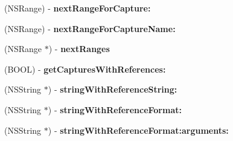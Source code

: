 \begin{DoxyCompactItemize}
\item 
\hypertarget{interface_r_k_enumerator_a52cf789fbf7fb3cbf4ed1032fa136017}{(N\-S\-Range) -\/ {\bfseries next\-Range\-For\-Capture\-:}}\label{interface_r_k_enumerator_a52cf789fbf7fb3cbf4ed1032fa136017}

\item 
\hypertarget{interface_r_k_enumerator_a4095a601af15dd62836adeb7105f88da}{(N\-S\-Range) -\/ {\bfseries next\-Range\-For\-Capture\-Name\-:}}\label{interface_r_k_enumerator_a4095a601af15dd62836adeb7105f88da}

\item 
\hypertarget{interface_r_k_enumerator_abbc9000769aeff849cf72e7ab527f760}{(N\-S\-Range $\ast$) -\/ {\bfseries next\-Ranges}}\label{interface_r_k_enumerator_abbc9000769aeff849cf72e7ab527f760}

\item 
\hypertarget{interface_r_k_enumerator_a1c0b4f336d4d2d43502f1589eab6023e}{(B\-O\-O\-L) -\/ {\bfseries get\-Captures\-With\-References\-:}}\label{interface_r_k_enumerator_a1c0b4f336d4d2d43502f1589eab6023e}

\item 
\hypertarget{interface_r_k_enumerator_a5fb7502952ee16f65bf61fa9c4ac72f3}{(N\-S\-String $\ast$) -\/ {\bfseries string\-With\-Reference\-String\-:}}\label{interface_r_k_enumerator_a5fb7502952ee16f65bf61fa9c4ac72f3}

\item 
\hypertarget{interface_r_k_enumerator_a541989a32e34fd28d84006904a96bd31}{(N\-S\-String $\ast$) -\/ {\bfseries string\-With\-Reference\-Format\-:}}\label{interface_r_k_enumerator_a541989a32e34fd28d84006904a96bd31}

\item 
\hypertarget{interface_r_k_enumerator_a22ac0d889cf2c09c315ac08f2c750cf7}{(N\-S\-String $\ast$) -\/ {\bfseries string\-With\-Reference\-Format\-:arguments\-:}}\label{interface_r_k_enumerator_a22ac0d889cf2c09c315ac08f2c750cf7}

\end{DoxyCompactItemize}

